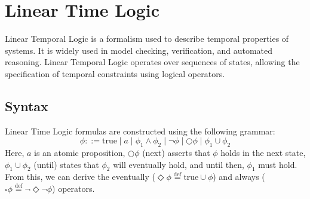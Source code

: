 \section{Linear Time Logic}

Linear Temporal Logic is a formalism used to describe temporal properties of systems. 
It is widely used in model checking, verification, and automated reasoning. 
Linear Temporal Logic operates over sequences of states, allowing the specification of temporal constraints using logical operators.

\subsection{Syntax}
Linear Time Logic formulas are constructed using the following grammar:
\[\phi::=\text{true}\mid a \mid \phi_1\land\phi_2\mid\lnot\phi\mid\bigcirc \phi\mid\phi_1\cup\phi_2\]
\noindent Here, $a$ is an atomic proposition, $\bigcirc\phi$ (next) asserts that $\phi$ holds in the next state, $\phi_1\cup\phi_2$ (until) states that $\phi_2$ will eventually hold, and until then, $\phi_1$ must hold.
From this, we can derive the eventually ($\Diamond\phi\overset{\text{def}}{=}\text{true}\cup\phi$) and always ($\square\phi\overset{\text{def}}{=}\lnot\Diamond\lnot\phi$) operators.

